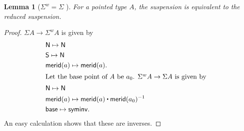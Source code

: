 \documentclass[11pt,a4paper,oneside,reqno]{amsart}
\newtheorem{lemma}[theorem]{Lemma}
\theoremstyle{definition}
\theoremstyle{remark}
\newcommand{\ct}{%
  \mathchoice{\mathbin{\raisebox{0.5ex}{$\displaystyle\centerdot$}}}%
             {\mathbin{\raisebox{0.5ex}{$\centerdot$}}}%
             {\mathbin{\raisebox{0.25ex}{$\scriptstyle\,\centerdot\,$}}}%
             {\mathbin{\raisebox{0.1ex}{$\scriptscriptstyle\,\centerdot\,$}}}
}
\newcommand{\North}{\mathsf N}
\newcommand{\South}{\mathsf S}
\newcommand{\merid}{\mathsf{merid}}
\begin{document}
\begin{lemma}[{$\Sigma^w = \Sigma$ \cite[Rem 8.6.3]{HoTT}}]
 For a pointed type $A$, the suspension is equivalent to the reduced suspension.
\end{lemma}
\begin{proof}
  $\Sigma A \to \Sigma^w A$ is given by
 \begin{align*}
  & \North \mapsto \North \\
  & \South \mapsto \North \\
  & \merid(a) \mapsto \merid(a).\\
  \intertext{Let the base point of $A$ be $a_0$.
  $\Sigma^w A \to \Sigma A$ is given by}
  & \North \mapsto \North \\
  & \merid(a) \mapsto \merid(a) \ct \merid(a_0)^{-1} \\
  & \mathsf{base} \mapsto \mathsf{syminv}.
 \end{align*}
 An easy calculation shows that these are inverses.
\end{proof}





\end{document}
